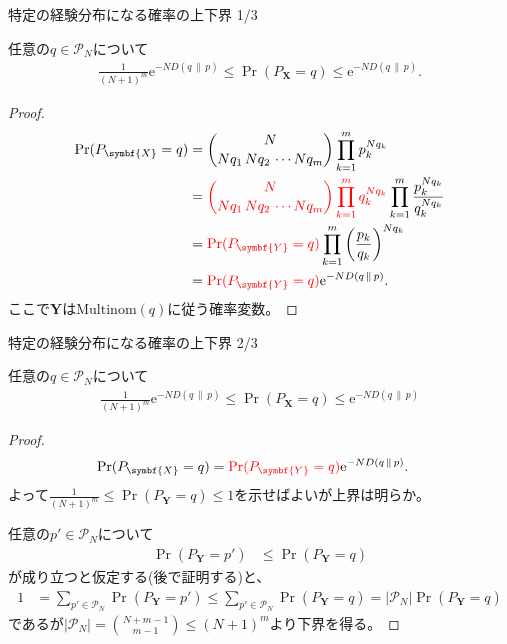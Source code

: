 \documentclass[lualatex,handout]{beamer}
\newcommand{\mycolor}[2]{%
  \begingroup
  \colorlet{currentcolor}{.}%
  \color{#1}#2%
  \color{currentcolor}%
  \endgroup
}
\newcommand{\emm}[1]{\mycolor{red}{#1}}
\newcommand\KL[2]{D(#1\,\|\,#2)}
\theoremstyle{definition}
\begin{document}
\begin{frame}{特定の経験分布になる確率の上下界 1/3}
\small
\begin{lemma}
任意の$q\in\mathcal{P}_N$について
\begin{align*}
\frac1{(N+1)^m}\mathrm{e}^{-N \KL{q}{p}}\le
\Pr(P_{\symbf{X}} = q)
\le \mathrm{e}^{-N \KL{q}{p}}.
\end{align*}
\end{lemma}
\begin{proof}
\vspace{-2em}
\begin{align*}
\Pr(P_{\symbf{X}}= q) &= \binom{N}{Nq_1\,Nq_2\,\dotsm Nq_m} \prod_{k=1}^m p_k^{Nq_k}\\
 &= \emm{\binom{N}{Nq_1\,Nq_2\,\dotsm Nq_m} \prod_{k=1}^m q_k^{Nq_k}}\prod_{k=1}^m\frac{p_k^{Nq_k}}{q_k^{Nq_k}}\\
 &= \emm{\Pr(P_{\symbf{Y}}= q)}\prod_{k=1}^m\left(\frac{p_k}{q_k}\right)^{Nq_k}\\
 &=\emm{\Pr(P_{\symbf{Y}}= q)}\mathrm{e}^{-N \KL{q}{p}}.
\end{align*}
ここで$\symbf{Y}$は$\mathrm{Multinom}(q)$に従う確率変数。
\end{proof}
\end{frame}

\begin{frame}{特定の経験分布になる確率の上下界 2/3}
\footnotesize
\begin{lemma}
任意の$q\in\mathcal{P}_N$について
\begin{align*}
\frac1{(N+1)^m}\mathrm{e}^{-N \KL{q}{p}}\le
\Pr(P_{\symbf{X}} = q)
\le \mathrm{e}^{-N \KL{q}{p}}
\end{align*}
\end{lemma}
\begin{proof}
\vspace{-2em}
\begin{align*}
\Pr(P_{\symbf{X}}= q) &= \emm{\Pr(P_{\symbf{Y}}= q)}\mathrm{e}^{-N \KL{q}{p}}.
\end{align*}
よって$\frac1{(N+1)^m}\le\Pr(P_{\symbf{Y}}= q)\le 1$を示せばよいが上界は明らか。

%
任意の$p'\in\mathcal{P}_N$について
\begin{align*}
\Pr\left(P_{\symbf{Y}}= p'\right)&\le
\Pr\left(P_{\symbf{Y}}= q\right)
\end{align*}
が成り立つと仮定する(後で証明する)と、
\begin{align*}
1&=\sum_{p'\in\mathcal{P}_N} \Pr\left(P_{\symbf{Y}}= p'\right)
\le\sum_{p'\in\mathcal{P}_N} \Pr\left(P_{\symbf{Y}}= q\right)
=|\mathcal{P}_N| \Pr\left(P_{\symbf{Y}}= q\right)
\end{align*}
であるが$|\mathcal{P}_N|=\binom{N+m-1}{m-1}\le (N+1)^m$より下界を得る。
\end{proof}
\end{frame}
\end{document}
